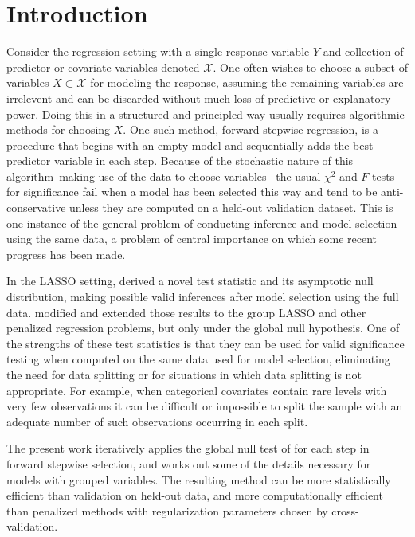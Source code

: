 \documentclass{imsart}
\begin{document}
\section{Introduction}
\label{sec:intro}

Consider the regression setting with a single response variable $Y$
and collection of predictor or covariate variables denoted $\mathcal X$.
One often wishes to choose a subset of variables $X \subset \mathcal X$
for modeling the response, assuming the remaining variables are
irrelevent and can be discarded without much loss of predictive
or explanatory power. Doing this in a structured and principled way
usually requires algorithmic methods for choosing $X$. One such method,
forward stepwise regression, is a procedure
that begins with an empty model and sequentially adds the best predictor
variable in each step. Because of the stochastic nature of this
algorithm--making use of the data to choose variables--
the usual $\chi^2$ and $F$-tests for significance
fail when a model has been selected this way and tend to be
anti-conservative unless they are computed on a held-out validation
dataset. This is one instance of the general problem of conducting
inference and model selection using the same data, a problem
of central importance on which some recent progress has been made.

In the LASSO setting, \cite{significance:LASSO} derived
a novel test statistic and its asymptotic null distribution, making
possible valid inferences after model selection using the full data.
\cite{tests:adaptive} modified and extended those results to the
group LASSO \citep{groupLASSO} and other penalized regression
problems, but only under the global null hypothesis.
One of the strengths of these test statistics is that they can be
used for valid significance testing when computed on the same
data used for model selection, eliminating the need for data splitting
or for situations in which data splitting is not appropriate. For example,
when categorical covariates contain rare levels with very few observations
it can be difficult or impossible to split the sample with an adequate
number of such observations occurring in each split.

The present work iteratively applies the global null test
of \cite{tests:adaptive} for each step in forward stepwise selection,
and works out some of the details necessary for
models with grouped variables. The resulting method can
be more statistically efficient than validation on held-out data, and
more computationally efficient than penalized methods with
regularization parameters chosen by cross-validation.
\end{document}
